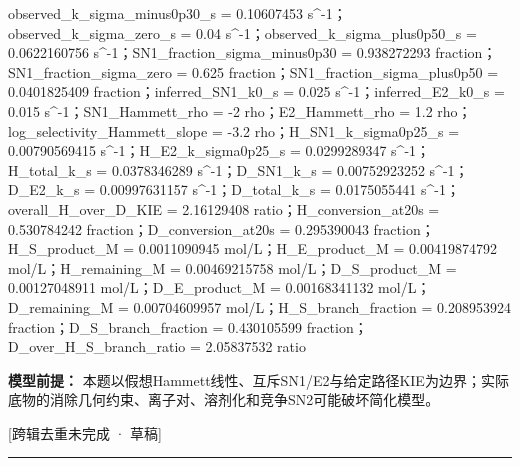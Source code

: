 \documentclass[UTF8,11pt,a4paper]{ctexart}
\begin{document}
observed\_k\_sigma\_minus0p30\_s = 0.10607453 s\textasciicircum{}-1；observed\_k\_sigma\_zero\_s = 0.04 s\textasciicircum{}-1；observed\_k\_sigma\_plus0p50\_s = 0.0622160756 s\textasciicircum{}-1；SN1\_fraction\_sigma\_minus0p30 = 0.938272293 fraction；SN1\_fraction\_sigma\_zero = 0.625 fraction；SN1\_fraction\_sigma\_plus0p50 = 0.0401825409 fraction；inferred\_SN1\_k0\_s = 0.025 s\textasciicircum{}-1；inferred\_E2\_k0\_s = 0.015 s\textasciicircum{}-1；SN1\_Hammett\_rho = -2 rho；E2\_Hammett\_rho = 1.2 rho；log\_selectivity\_Hammett\_slope = -3.2 rho；H\_SN1\_k\_sigma0p25\_s = 0.00790569415 s\textasciicircum{}-1；H\_E2\_k\_sigma0p25\_s = 0.0299289347 s\textasciicircum{}-1；H\_total\_k\_s = 0.0378346289 s\textasciicircum{}-1；D\_SN1\_k\_s = 0.00752923252 s\textasciicircum{}-1；D\_E2\_k\_s = 0.00997631157 s\textasciicircum{}-1；D\_total\_k\_s = 0.0175055441 s\textasciicircum{}-1；overall\_H\_over\_D\_KIE = 2.16129408 ratio；H\_conversion\_at20s = 0.530784242 fraction；D\_conversion\_at20s = 0.295390043 fraction；H\_S\_product\_M = 0.0011090945 mol/L；H\_E\_product\_M = 0.00419874792 mol/L；H\_remaining\_M = 0.00469215758 mol/L；D\_S\_product\_M = 0.00127048911 mol/L；D\_E\_product\_M = 0.00168341132 mol/L；D\_remaining\_M = 0.00704609957 mol/L；H\_S\_branch\_fraction = 0.208953924 fraction；D\_S\_branch\_fraction = 0.430105599 fraction；D\_over\_H\_S\_branch\_ratio = 2.05837532 ratio\par
\noindent\textbf{模型前提：}
本题以假想Hammett线性、互斥SN1/E2与给定路径KIE为边界；实际底物的消除几何约束、离子对、溶剂化和竞争SN2可能破坏简化模型。\par
\noindent\textcolor{red!65!black}{[跨辑去重未完成 · 草稿]} \par
\medskip\hrule\medskip
{}
\end{document}
